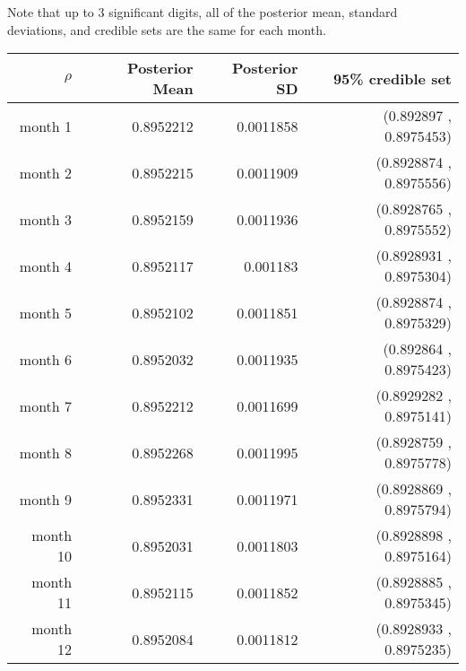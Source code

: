 \documentclass[
]{article}
\begin{document}
Note that up to 3 significant digits, all of the posterior mean,
standard deviations, and credible sets are the same for each month.

\begin{longtable}[]{@{}rrrr@{}}
\toprule
\(\rho\) & Posterior Mean & Posterior SD & 95\% credible
set\tabularnewline
\midrule
\endhead
month 1 & 0.8952212 & 0.0011858 & (0.892897 , 0.8975453)\tabularnewline
month 2 & 0.8952215 & 0.0011909 & (0.8928874 , 0.8975556)\tabularnewline
month 3 & 0.8952159 & 0.0011936 & (0.8928765 , 0.8975552)\tabularnewline
month 4 & 0.8952117 & 0.001183 & (0.8928931 , 0.8975304)\tabularnewline
month 5 & 0.8952102 & 0.0011851 & (0.8928874 , 0.8975329)\tabularnewline
month 6 & 0.8952032 & 0.0011935 & (0.892864 , 0.8975423)\tabularnewline
month 7 & 0.8952212 & 0.0011699 & (0.8929282 , 0.8975141)\tabularnewline
month 8 & 0.8952268 & 0.0011995 & (0.8928759 , 0.8975778)\tabularnewline
month 9 & 0.8952331 & 0.0011971 & (0.8928869 , 0.8975794)\tabularnewline
month 10 & 0.8952031 & 0.0011803 & (0.8928898 ,
0.8975164)\tabularnewline
month 11 & 0.8952115 & 0.0011852 & (0.8928885 ,
0.8975345)\tabularnewline
month 12 & 0.8952084 & 0.0011812 & (0.8928933 ,
0.8975235)\tabularnewline
\bottomrule
\end{longtable}
\end{document}
